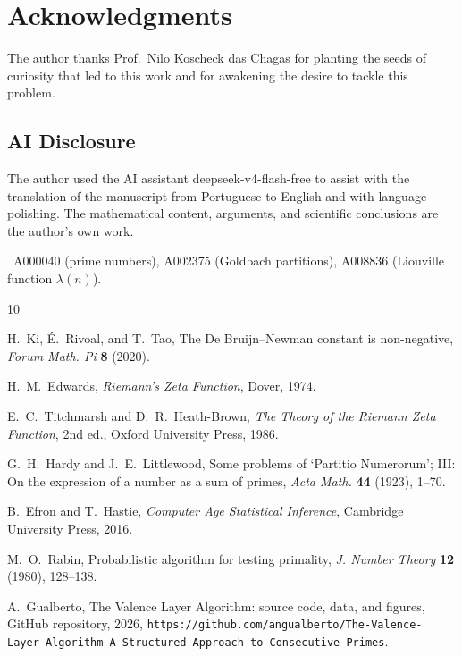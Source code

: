\documentclass[12pt,a4paper]{article}
\theoremstyle{plain}
\begin{document}
\section{Acknowledgments}
The author thanks Prof.\ Nilo Koscheck das Chagas for planting the seeds
of curiosity that led to this work and for awakening the desire to
tackle this problem.

\subsection*{AI Disclosure}
The author used the AI assistant deepseek-v4-flash-free to assist
with the translation of the manuscript from Portuguese to English
and with language polishing.  The mathematical content, arguments,
and scientific conclusions are the author's own work.

\
A000040 (prime numbers),
A002375 (Goldbach partitions),
A008836 (Liouville function $\lambda(n)$).

\begin{thebibliography}{10}

 H.~Ki, \'E.~Rivoal, and T.~Tao,
  The De Bruijn--Newman constant is non-negative,
  {\it Forum Math. Pi} \textbf{8} (2020).

 H.~M.~Edwards,
  {\it Riemann's Zeta Function}, Dover, 1974.

 E.~C.~Titchmarsh and D.~R.~Heath-Brown,
  {\it The Theory of the Riemann Zeta Function},
  2nd ed., Oxford University Press, 1986.

 G.~H.~Hardy and J.~E.~Littlewood,
  Some problems of `Partitio Numerorum'; III: On the expression
  of a number as a sum of primes,
  {\it Acta Math.} \textbf{44} (1923), 1--70.

 B.~Efron and T.~Hastie,
  {\it Computer Age Statistical Inference}, Cambridge University Press, 2016.

 M.~O.~Rabin,
  Probabilistic algorithm for testing primality,
  {\it J. Number Theory} \textbf{12} (1980), 128--138.

 A.~Gualberto,
  The Valence Layer Algorithm: source code, data, and figures,
  GitHub repository, 2026,
  \texttt{https://github.com/angualberto/The-Valence-Layer-Algorithm-A-Structured-Approach-to-Consecutive-Primes}.

\end{thebibliography}
\end{document}
